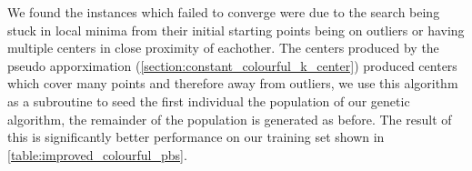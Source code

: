 We found the instances which failed to converge were due to the search being stuck in local minima from their initial starting points being on outliers or having multiple centers in close proximity of eachother. The centers produced by the pseudo apporximation (\cref{section:constant_colourful_k_center}) produced centers which cover many points and therefore away from outliers, we use this algorithm as a subroutine to seed the first individual the population of our genetic algorithm, the remainder of the population is generated as before. The result of this is significantly better performance on our training set shown in \cref{table:improved_colourful_pbs}.

